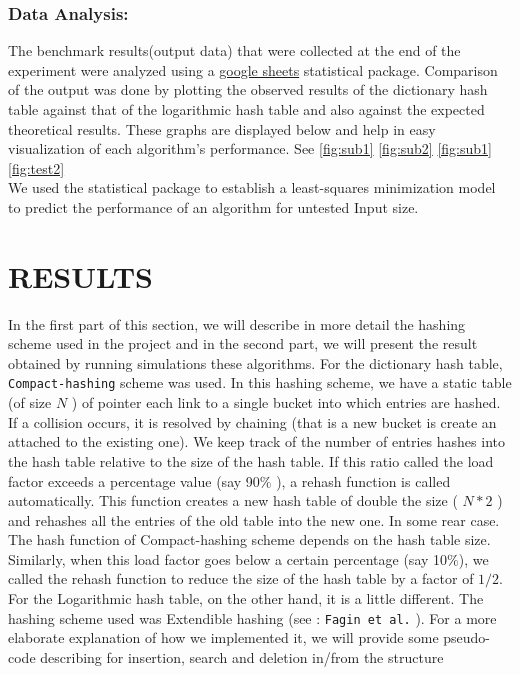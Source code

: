 \documentclass[a4paper,12pt, openany]{book}
\begin{document}
\subsection{Data Analysis:}
The benchmark results(output data) that were collected at the end of the experiment were analyzed using a \href{https://www.google.com/sheets/about/}{google sheets} statistical package. Comparison of the output was done by plotting the observed results of the dictionary hash table against that of the logarithmic hash table and also against the expected theoretical results. These graphs are displayed below and help in easy visualization of each algorithm's performance. See \ref{fig:sub1} \ref{fig:sub2} \ref{fig:sub1} \ref{fig:test2} \\
We used the statistical package to establish a least-squares minimization model to predict the performance of an algorithm for untested Input size. 






\chapter{RESULTS}
\label{chap:RESULTS}
In the first part of this section, we will describe in more detail the hashing scheme used in the project and in the second part, we will present the result obtained by running simulations these algorithms. \bigbreak
For the dictionary hash table, \texttt{Compact-hashing} scheme was used. In this hashing scheme, we have a static table (of size $N$ ) of pointer each link to a single bucket into which entries are hashed. If a collision occurs, it is resolved by chaining (that is a new bucket is create an attached to the existing one). We keep track of the number of entries hashes into the hash table relative to the size of the hash table. If this ratio called the load factor exceeds a percentage value (say 90$\%$ ), a rehash function is called automatically. This function creates a new hash table of double the size ( $N * 2$ ) and rehashes all the entries of the old table into the new one. In some rear case. The hash function of Compact-hashing scheme depends on the hash table size. Similarly, when this load factor goes below a certain percentage (say 10$\%$), we called the rehash function to reduce the size of the hash table by a factor of $1/2$. \bigbreak
For the Logarithmic hash table, on the other hand, it is a little different. The hashing scheme used was Extendible hashing (see : \texttt{Fagin et al.} \cite{vitter2008algorithms}). For a more elaborate explanation of how we implemented it, we will provide some pseudo-code describing for insertion, search and deletion in/from the structure \bigbreak
\end{document}

